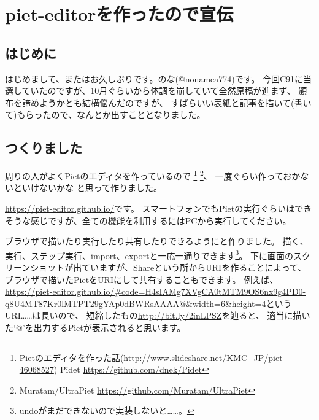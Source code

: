 \chapter[piet-editorを作ったので宣伝]{piet-editorを作ったので宣伝}

\section{はじめに}

はじめまして、またはお久しぶりです。のな(@nonamea774)です。
今回C91に当選していたのですが、10月ぐらいから体調を崩していて全然原稿が進まず、
頒布を諦めようかとも結構悩んだのですが、
すばらいい表紙と記事を描いて(書いて)もらったので、なんとか出すこととなりました。


\section{つくりました}

周りの人がよくPietのエディタを作っているので
\footnote{Pietのエディタを作った話(\url{http://www.slideshare.net/KMC_JP/piet-46068527}) Pidet \url{https://github.com/dnek/Pidet}}
\footnote{Muratam/UltraPiet \url{https://github.com/Muratam/UltraPiet}}、
一度ぐらい作っておかないといけないかな と思って作りました。

\url{https://piet-editor.github.io/}です。
スマートフォンでもPietの実行ぐらいはできそうな感じですが、全ての機能を利用するにはPCから実行してください。

ブラウザで描いたり実行したり共有したりできるようにと作りました。
描く、実行、ステップ実行、import、exportと一応一通りできます\footnote{undoがまだできないので実装しないと……。}。
下に画面のスクリーンショットが出ていますが、Shareという所からURIを作ることによって、
ブラウザで描いたPietをURIにして共有することもできます。
例えば、\href{https://piet-editor.github.io/#code=H4sIAMg7XVgCA0tMTM9OS6nx9g4PD0-q8U4MT87Kr0lMTPT29gYAp0dBWRsAAAA@&width=6&height=4}{https://piet-editor.github.io/\#code=H4sIAMg7XVgCA0tMTM9OS6nx9g4PD0-q8U4MT87Kr0lMTPT29gYAp0dBWRsAAAA@\&width=6\&height=4}というURI……は長いので、
短縮したもの\url{http://bit.ly/2inLPSZ}を辿ると、
適当に描いた`@'を出力するPietが表示されると思います。


